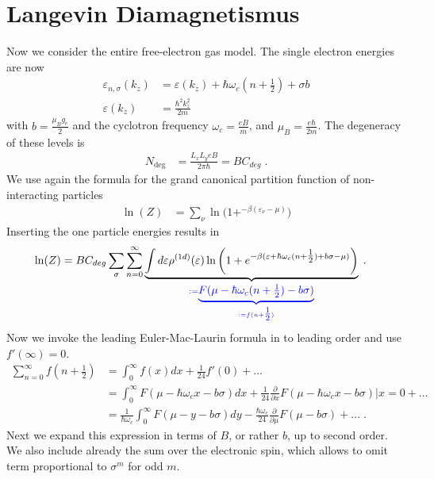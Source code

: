 \section{Langevin Diamagnetismus}
Now we consider the entire free-electron gas model.
The single electron energies are now
%
\begin{align*}
\varepsilon_{n,\sigma}(k_{z}) &=\varepsilon(k_{z})
+\hbar \omega_{c} (n+\tfrac{1}{2}) + \sigma b\\
\varepsilon(k_{z}) &=\frac{\hbar^{2} k_{z}^{2}}{2m}
\end{align*}
%
with $b=\frac{\mu_{B} g_{e}}{2}$ and the cyclotron frequency $\omega_{c} = \frac{e B}{m}$, and $\mu_{B} = \frac{e \hbar}{2m}$.  
The degeneracy of these levels is 
%
\begin{align*}
N_\text{deg} &= \frac{L_{x}L_{y} e B}{2 \pi \hbar} = B C_{deg}\;.
\end{align*}
%
We use again the formula for the grand canonical partition function of non-interacting particles 
%
\begin{align*}
\ln(Z)
&= \sum_{\nu} \ln\big( 1+^{-\beta(\varepsilon_{\nu}-\mu)} \big)
\end{align*}
%
Inserting the one particle energies results in
%
\begin{align}
\ln(Z)
&= B C_{deg}\sum_{\sigma} \sum_{n=0}^{\infty}\underbrace{
\int d\varepsilon\rho^{(1d)}(\varepsilon)
\ln\bigg( 1+e^{-\beta(\varepsilon + \hbar \omega_{c}(n+\tfrac{1}{2}) + b\sigma-\mu)} \bigg)
}_{\color{blue} := \underbrace{
F(\mu - \hbar \omega_{c}(n+\tfrac12) -b\sigma)
}_{\color{blue} := f(n+\tfrac12)}}\;.
\end{align}
%
Now we invoke the leading Euler-Mac-Laurin formula in  to leading order 
and use $f'(\infty)=0$.
%
\begin{align*}
\sum_{n=0}^{\infty} f(n+\tfrac12) &= \int_{0}^{\infty} f(x) dx
+\frac{1}{24} f'(0) +\ldots\\
&=\int_{0}^{\infty} F(\mu-\hbar \omega_{c} x -b \sigma ) dx
+\frac{1}{24}\frac{\partial }{\partial x} F(\mu-\hbar \omega_{c} x -b \sigma )\bigg|x=0 +\ldots\\
&=\frac{1}{\hbar \omega_{c}}\int_{0}^{\infty} F(\mu-y -b \sigma) dy
-\frac{\hbar \omega_{c}}{24}\frac{\partial }{\partial \mu} F(\mu-b \sigma ) +\ldots\;.
\end{align*}
%
Next we expand this expression in terms of $B$, or rather $b$, up to second order. We also include already the sum over the electronic spin, which allows to omit term proportional to $\sigma^{m}$ for odd $m$.

